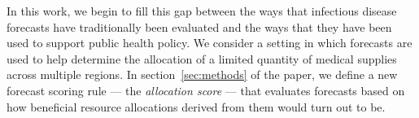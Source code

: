 \documentclass{article}\usepackage[]{graphicx}\usepackage[]{xcolor}
\begin{document}
In this work, we begin to fill this gap between the ways that infectious disease forecasts have traditionally been evaluated and the ways that they have been used to support public health policy.
We consider a setting in which forecasts are used to help determine the allocation of a limited quantity of medical supplies across multiple regions.
In section~\ref{sec:methods} of the paper, we define a new forecast scoring rule --- the {\em allocation score} --- that evaluates forecasts based on how beneficial resource allocations derived from them would turn out to be.

\end{document}
